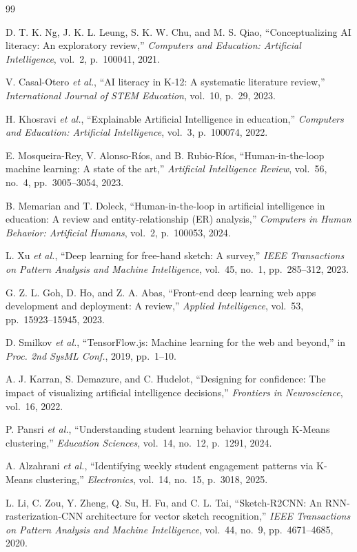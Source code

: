 \documentclass[12pt,a4paper,oneside,openany]{report}
\begin{document}
\begin{thebibliography}{99}

D. T. K. Ng, J. K. L. Leung, S. K. W. Chu, and M. S. Qiao, ``Conceptualizing AI literacy: An exploratory review,'' \textit{Computers and Education: Artificial Intelligence}, vol.~2, p.~100041, 2021.

V. Casal-Otero \textit{et al.}, ``AI literacy in K-12: A systematic literature review,'' \textit{International Journal of STEM Education}, vol.~10, p.~29, 2023.

H. Khosravi \textit{et al.}, ``Explainable Artificial Intelligence in education,'' \textit{Computers and Education: Artificial Intelligence}, vol.~3, p.~100074, 2022.

E. Mosqueira-Rey, V. Alonso-R\'ios, and B. Rubio-R\'ios, ``Human-in-the-loop machine learning: A state of the art,'' \textit{Artificial Intelligence Review}, vol.~56, no.~4, pp.~3005--3054, 2023.

B. Memarian and T. Doleck, ``Human-in-the-loop in artificial intelligence in education: A review and entity-relationship (ER) analysis,'' \textit{Computers in Human Behavior: Artificial Humans}, vol.~2, p.~100053, 2024.

L. Xu \textit{et al.}, ``Deep learning for free-hand sketch: A survey,'' \textit{IEEE Transactions on Pattern Analysis and Machine Intelligence}, vol.~45, no.~1, pp.~285--312, 2023.

G. Z. L. Goh, D. Ho, and Z. A. Abas, ``Front-end deep learning web apps development and deployment: A review,'' \textit{Applied Intelligence}, vol.~53, pp.~15923--15945, 2023.

D. Smilkov \textit{et al.}, ``TensorFlow.js: Machine learning for the web and beyond,'' in \textit{Proc. 2nd SysML Conf.}, 2019, pp.~1--10.

A. J. Karran, S. Demazure, and C. Hudelot, ``Designing for confidence: The impact of visualizing artificial intelligence decisions,'' \textit{Frontiers in Neuroscience}, vol.~16, 2022.

P. Pansri \textit{et al.}, ``Understanding student learning behavior through K-Means clustering,'' \textit{Education Sciences}, vol.~14, no.~12, p.~1291, 2024.

A. Alzahrani \textit{et al.}, ``Identifying weekly student engagement patterns via K-Means clustering,'' \textit{Electronics}, vol.~14, no.~15, p.~3018, 2025.

L. Li, C. Zou, Y. Zheng, Q. Su, H. Fu, and C. L. Tai, ``Sketch-R2CNN: An RNN-rasterization-CNN architecture for vector sketch recognition,'' \textit{IEEE Transactions on Pattern Analysis and Machine Intelligence}, vol.~44, no.~9, pp.~4671--4685, 2020.

\end{thebibliography}
\end{document}
